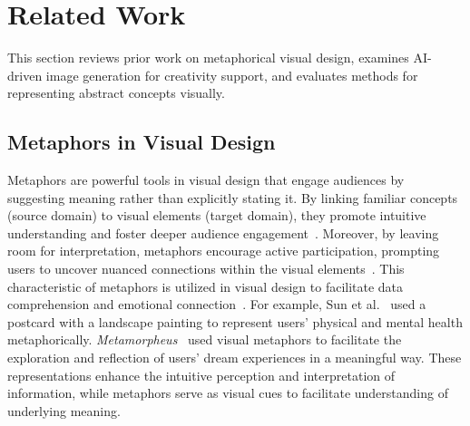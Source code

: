 \section{Related Work}

This section reviews prior work on metaphorical visual design, examines AI-driven image generation for creativity support, and evaluates methods for representing abstract concepts visually.

\subsection{Metaphors in Visual Design}




Metaphors are powerful tools in visual design that engage audiences by suggesting meaning rather than explicitly stating it. 
By linking familiar concepts (source domain) to visual elements (target domain), they promote intuitive understanding and foster deeper audience engagement~\cite{4308795}.
Moreover, by leaving room for interpretation, metaphors encourage active participation, prompting users to uncover nuanced connections within the visual elements~\cite{Duit1991-DUIOTR}.
This characteristic of metaphors is utilized in visual design to facilitate data comprehension and emotional connection~\cite{da2016semantic}.
For example,  
Sun et al.~\cite{10.1145/3357236.3395475} used a postcard with a landscape painting to represent users' physical and mental health metaphorically.
\textit{Metamorpheus}~\cite{10.1145/3613904.3642410} used visual metaphors to facilitate the exploration and reflection of users' dream experiences in a meaningful way.
These representations enhance the intuitive perception and interpretation of information, while metaphors serve as visual cues to facilitate understanding of underlying meaning.




